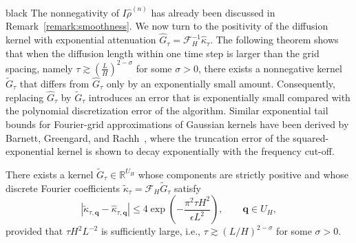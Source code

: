 \documentclass[review,onefignum,onetabnum]{siamart250211}
\begin{document}
\begin{color}{black}
The nonnegativity of $I\hat{\rho}^{(n)}$ has already been discussed in Remark~\ref{remark:smoothness}. We now turn to the positivity of the diffusion kernel with exponential attenuation $\widehat{G}_{\tau}=\mathcal{F}_H^{-1}\hat{\kappa}_{\tau}$. The following theorem shows that when the diffusion length within one time step is larger than the grid spacing, namely $\tau \gtrsim \left(\frac{L}{H}\right)^{2-\sigma}$ for some $\sigma>0$, there exists a nonnegative kernel $\widetilde{G}_{\tau}$ that differs from $\widehat{G}_{\tau}$ only by an exponentially small amount. Consequently, replacing $\widehat{G}_{\tau}$ by $\widetilde{G}_{\tau}$ introduces an error that is exponentially small compared with the polynomial discretization error of the algorithm. Similar exponential tail bounds for Fourier-grid approximations of Gaussian kernels have been derived by Barnett, Greengard, and Rachh~\cite{uniform}, where the truncation error of the squared-exponential kernel is shown to decay exponentially with the frequency cut-off.
\begin{theorem}
\label{theorem:positive_diffusion_kernel}
There exists a kernel
$\widetilde{G}_{\tau}\in\mathbb{R}^{U_H}$ whose components are strictly positive and whose discrete Fourier coefficients
$\widetilde{\kappa}_{\tau}=\mathcal{F}_H\widetilde{G}_{\tau}$ satisfy
\begin{equation}
\left|
\widetilde{\kappa}_{\tau,\mathbf q}
-
\hat{\kappa}_{\tau,\mathbf q}
\right|
\leq
4\exp\left(
-\frac{\pi^2\tau H^2}{\epsilon L^2}
\right),
\qquad \mathbf q\in U_H,
\end{equation}
provided that $\tau H^2L^{-2}$ is sufficiently large, i.e., $\tau\gtrsim (L/H)^{2-\sigma}$ for some $\sigma>0$.
\end{theorem}


\end{color}
\end{document}
